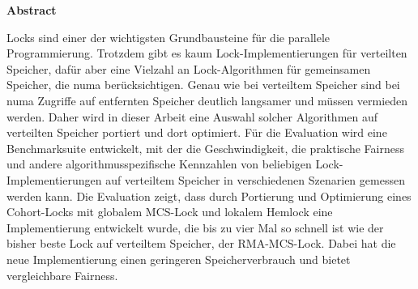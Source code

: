 \vspace*{2cm}

\begin{center}
    \textbf{Abstract}
\end{center}

\vspace*{1cm}

\noindent Locks sind einer der wichtigsten Grundbausteine für die parallele Programmierung.
Trotzdem gibt es kaum Lock-Implementierungen für verteilten Speicher,
dafür aber eine Vielzahl an Lock-Algorithmen für gemeinsamen Speicher,
die \gls{numa} berücksichtigen.
Genau wie bei verteiltem Speicher
sind bei \gls{numa} Zugriffe auf entfernten Speicher deutlich langsamer
und müssen vermieden werden.
Daher wird in dieser Arbeit eine Auswahl solcher Algorithmen
auf verteilten Speicher portiert
und dort optimiert.
Für die Evaluation wird eine Benchmarksuite entwickelt,
mit der die Geschwindigkeit,
die praktische Fairness
und andere algorithmusspezifische Kennzahlen
von beliebigen Lock-Implementierungen auf verteiltem Speicher
in verschiedenen Szenarien gemessen werden kann.
Die Evaluation zeigt,
dass durch Portierung und Optimierung eines Cohort-Locks
mit globalem MCS-Lock und lokalem Hemlock
eine Implementierung entwickelt wurde,
die bis zu vier Mal so schnell ist
wie der bisher beste Lock auf verteiltem Speicher,
der RMA-MCS-Lock.
Dabei hat die neue Implementierung einen geringeren Speicherverbrauch
und bietet vergleichbare Fairness.
